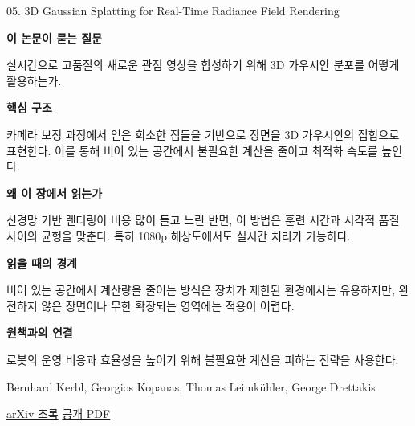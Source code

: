 \documentclass[11pt,openany]{book}
\begin{document}
\begin{termcard}{05. 3D Gaussian Splatting for Real-Time Radiance Field Rendering}

\par

\medskip

{\sffamily\bfseries\color{deepblue} 이 논문이 묻는 질문}\par

실시간으로 고품질의 새로운 관점 영상을 합성하기 위해 3D 가우시안 분포를 어떻게 활용하는가.

\smallskip

{\sffamily\bfseries\color{deepblue} 핵심 구조}\par

카메라 보정 과정에서 얻은 희소한 점들을 기반으로 장면을 3D 가우시안의 집합으로 표현한다. 이를 통해 비어 있는 공간에서 불필요한 계산을 줄이고 최적화 속도를 높인다.

\smallskip

{\sffamily\bfseries\color{deepblue} 왜 이 장에서 읽는가}\par

신경망 기반 렌더링이 비용 많이 들고 느린 반면, 이 방법은 훈련 시간과 시각적 품질 사이의 균형을 맞춘다. 특히 1080p 해상도에서도 실시간 처리가 가능하다.

\smallskip

{\sffamily\bfseries\color{coral} 읽을 때의 경계}\par

비어 있는 공간에서 계산량을 줄이는 방식은 장치가 제한된 환경에서는 유용하지만, 완전하지 않은 장면이나 무한 확장되는 영역에는 적용이 어렵다.

\smallskip

{\sffamily\bfseries\color{teal} 원책과의 연결}\par

로봇의 운영 비용과 효율성을 높이기 위해 불필요한 계산을 피하는 전략을 사용한다.

\medskip

{\footnotesize\color{muted} Bernhard Kerbl, Georgios Kopanas, Thomas Leimkühler, George Drettakis\par

\href{https://arxiv.org/abs/2308.04079}{arXiv 초록} \quad \href{https://arxiv.org/pdf/2308.04079}{공개 PDF}\par}

\end{termcard}
\end{document}
